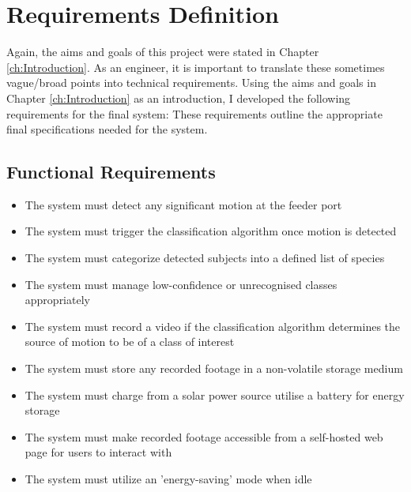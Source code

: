 \section{Requirements Definition}
\label{sec:RequirementsDefinition}

Again, the aims and goals of this project were stated in Chapter \ref{ch:Introduction}. As an engineer, it is important to translate these sometimes vague/broad points into technical requirements. Using the aims and goals in Chapter \ref{ch:Introduction} as an introduction, I developed the following requirements for the final system:
These requirements outline the appropriate final specifications needed for the system.

\subsection{Functional Requirements}
\label{subsec:FunctionalRequirements}
\begin{itemize}
    \item The system must detect any significant motion at the feeder port
    \item The system must trigger the classification algorithm once motion is detected
    \item The system must categorize detected subjects into a defined list of species
    \item The system must manage low-confidence or unrecognised classes appropriately
    \item The system must record a video if the classification algorithm determines the source of motion to be of a class of interest
    \item The system must store any recorded footage in a non-volatile storage medium
    \item The system must charge from a solar power source utilise a battery for energy storage
    \item The system must make recorded footage accessible from a self-hosted web page for users to interact with
    \item The system must utilize an 'energy-saving' mode when idle
    
\end{itemize}

